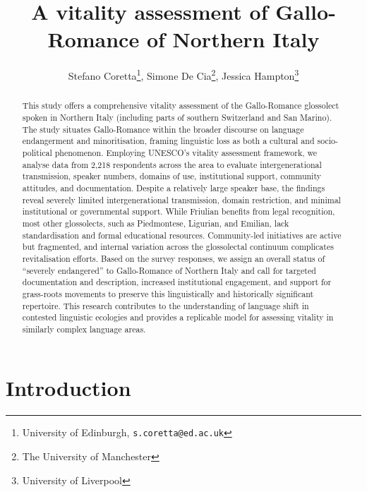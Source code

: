 \documentclass[a4paper,11pt]{article}
\title{A vitality assessment of Gallo-Romance of Northern Italy}
\author{Stefano Coretta\thanks{University of Edinburgh, \texttt{s.coretta@ed.ac.uk}}, Simone De Cia\thanks{The University of Manchester}, Jessica Hampton\thanks{University of Liverpool}}
\begin{document}
\maketitle


\begin{abstract}
This study offers a comprehensive vitality assessment of the Gallo-Romance glossolect spoken in Northern Italy (including parts of southern Switzerland and San Marino). The study situates Gallo-Romance within the broader discourse on language endangerment and minoritisation, framing linguistic loss as both a cultural and socio-political phenomenon. Employing UNESCO’s vitality assessment framework, we analyse data from 2,218 respondents across the area to evaluate intergenerational transmission, speaker numbers, domains of use, institutional support, community attitudes, and documentation. Despite a relatively large speaker base, the findings reveal severely limited intergenerational transmission, domain restriction, and minimal institutional or governmental support. While Friulian benefits from legal recognition, most other glossolects, such as Piedmontese, Ligurian, and Emilian, lack standardisation and formal educational resources. Community-led initiatives are active but fragmented, and internal variation across the glossolectal continuum complicates revitalisation efforts. Based on the survey responses, we assign an overall status of ``severely endangered'' to Gallo-Romance of Northern Italy and call for targeted documentation and description, increased institutional engagement, and support for grass-roots movements to preserve this linguistically and historically significant repertoire. This research contributes to the understanding of language shift in contested linguistic ecologies and provides a replicable model for assessing vitality in similarly complex language areas.
\end{abstract}

\section{Introduction}
\end{document}
